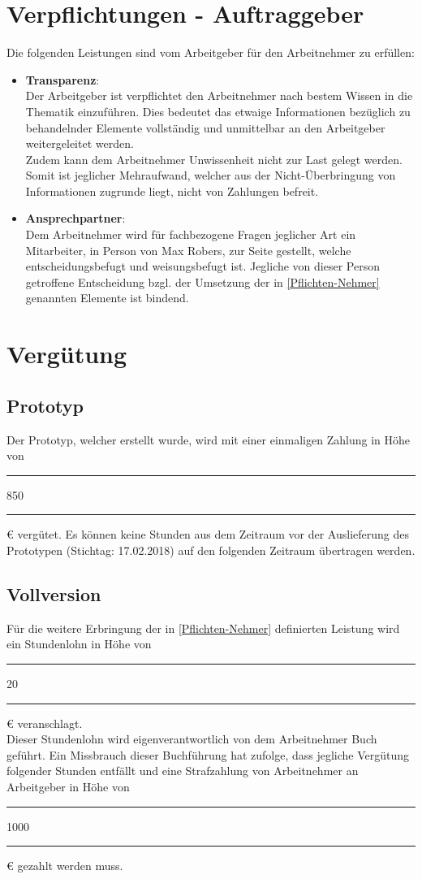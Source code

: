 \documentclass[a4paper,12pt]{article}
\newcommand{\stellvertreter}{Max Robers}
\newcommand{\prototypTag}{17.02.2018}
\begin{document}
	\section{Verpflichtungen - Auftraggeber} \label{Pflichten-Geber}
		Die folgenden Leistungen sind vom Arbeitgeber für den Arbeitnehmer zu erfüllen:
		\begin{itemize}
			\item \textbf{Transparenz}: \label{Transparenz}\\
				Der Arbeitgeber ist verpflichtet den Arbeitnehmer nach bestem Wissen in die Thematik einzuführen. Dies bedeutet das etwaige Informationen bezüglich zu behandelnder Elemente vollständig und unmittelbar an den Arbeitgeber weitergeleitet werden. \\
				Zudem kann dem Arbeitnehmer Unwissenheit nicht zur Last gelegt werden. Somit ist jeglicher Mehraufwand, welcher aus der Nicht-Überbringung von Informationen zugrunde liegt, nicht von Zahlungen befreit.
			\item \textbf{Ansprechpartner}: \label{Ansprechpartner}\\
				Dem Arbeitnehmer wird für fachbezogene Fragen jeglicher Art ein Mitarbeiter, in Person von \stellvertreter, zur Seite gestellt, welche entscheidungsbefugt und weisungsbefugt ist. Jegliche von dieser Person getroffene Entscheidung bzgl. der Umsetzung der in \ref{Pflichten-Nehmer} genannten Elemente ist bindend.
		\end{itemize}
	\section{Vergütung} \label{Verguetung}
		\subsection{Prototyp} %
			Der Prototyp, welcher erstellt wurde, wird mit einer einmaligen Zahlung in Höhe von \rule{0.5cm}{0.4pt}850\rule{0.5cm}{0.4pt} \euro\xspace vergütet. Es können keine Stunden aus dem Zeitraum vor der Auslieferung des Prototypen (Stichtag: \prototypTag) auf den folgenden Zeitraum übertragen werden.
		\subsection{Vollversion} %
			Für die weitere Erbringung der in \ref{Pflichten-Nehmer} definierten Leistung wird ein Stundenlohn in Höhe von \rule{0.5cm}{0.4pt}20\rule{0.5cm}{0.4pt} \euro\xspace veranschlagt.\\
			Dieser Stundenlohn wird eigenverantwortlich von dem Arbeitnehmer Buch geführt. Ein Missbrauch dieser Buchführung hat zufolge, dass jegliche Vergütung folgender Stunden entfällt und eine Strafzahlung von Arbeitnehmer an Arbeitgeber in Höhe von \rule{0.5cm}{0.4pt}1000\rule{0.5cm}{0.4pt} \euro\xspace gezahlt werden muss.
\end{document}
